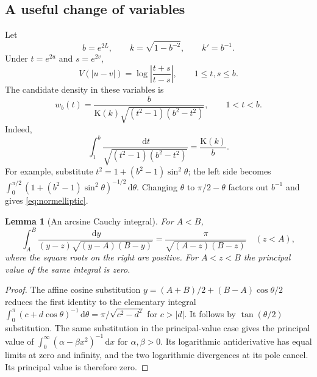 \documentclass[11pt,a4paper]{article}
\newtheorem{lemma}[theorem]{Lemma}
\theoremstyle{definition}
\theoremstyle{remark}
\newcommand{\dd}{\,\mathrm d}
\newcommand{\K}{\mathrm K}
\begin{document}
\subsection{A useful change of variables}
Let
\begin{equation}
 b=e^{2L},\qquad k=\sqrt{1-b^{-2}},\qquad k'=b^{-1}.
 \label{eq:moduli}
\end{equation}
Under $t=e^{2u}$ and $s=e^{2v}$,
\begin{equation}
 V(|u-v|)=\log\left|\frac{t+s}{t-s}\right|,
 \qquad 1\le t,s\le b.
 \label{eq:green-kernel}
\end{equation}
The candidate density in these variables is
\begin{equation}
 w_b(t)=\frac{b}{\K(k)\sqrt{(t^2-1)(b^2-t^2)}},\qquad 1<t<b.
 \label{eq:w}
\end{equation}
Indeed,
\begin{equation}
 \int_1^b\frac{\dd t}{\sqrt{(t^2-1)(b^2-t^2)}}=\frac{\K(k)}b.
 \label{eq:normelliptic}
\end{equation}
For example, substitute $t^2=1+(b^2-1)\sin^2\theta$; the left side becomes
$\int_0^{\pi/2}(1+(b^2-1)\sin^2\theta)^{-1/2}\dd\theta$.
Changing $\theta$ to $\pi/2-\theta$ factors out $b^{-1}$ and gives
\eqref{eq:normelliptic}.

\begin{lemma}[An arcsine Cauchy integral]
\label{lem:arcsine}
For $A<B$,
\begin{equation}
 \int_A^B\frac{\dd y}{(y-z)\sqrt{(y-A)(B-y)}}
 =\frac{\pi}{\sqrt{(A-z)(B-z)}}\quad(z<A),
 \label{eq:arcsineoutside}
\end{equation}
where the square roots on the right are positive. For $A<z<B$ the
principal value of the same integral is zero.
\end{lemma}
\begin{proof}
The affine cosine substitution $y=(A+B)/2+(B-A)\cos\theta/2$ reduces the
first identity to the elementary integral
$\int_0^\pi(c+d\cos\theta)^{-1}\dd\theta=\pi/\sqrt{c^2-d^2}$ for $c>|d|$.
It follows by $\tan(\theta/2)$ substitution. The same substitution in the
principal-value case gives the principal value of
$\int_0^\infty(\alpha-\beta x^2)^{-1}\dd x$ for $\alpha,\beta>0$.
Its logarithmic antiderivative has equal limits at zero and infinity, and
the two logarithmic divergences at its pole cancel. Its principal value is
therefore zero.
\end{proof}
\end{document}
